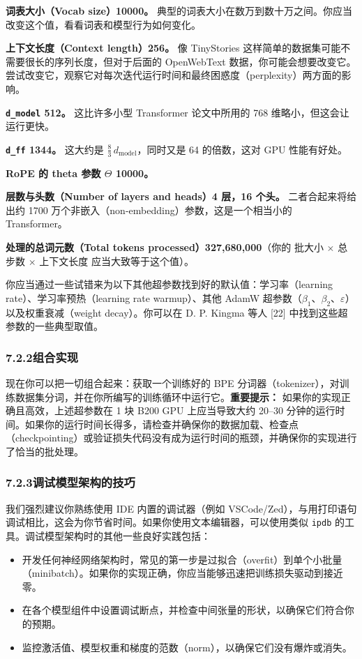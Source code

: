 \textbf{词表大小（Vocab size）10000。} 典型的词表大小在数万到数十万之间。你应当改变这个值，看看词表和模型行为如何变化。

\textbf{上下文长度（Context length）256。} 像 TinyStories 这样简单的数据集可能不需要很长的序列长度，但对于后面的 OpenWebText 数据，你可能会想要改变它。尝试改变它，观察它对每次迭代运行时间和最终困惑度（perplexity）两方面的影响。

\textbf{\texttt{d\_model} 512。} 这比许多小型 Transformer 论文中所用的 768 维略小，但这会让运行更快。

\textbf{\texttt{d\_ff} 1344。} 这大约是 $\frac{8}{3}\, d_{\text{model}}$，同时又是 64 的倍数，这对 GPU 性能有好处。

\textbf{RoPE 的 theta 参数 $\Theta$ 10000。}

\textbf{层数与头数（Number of layers and heads）4 层，16 个头。} 二者合起来将给出约 1700 万个非嵌入（non-embedding）参数，这是一个相当小的 Transformer。

\textbf{处理的总词元数（Total tokens processed）327{,}680{,}000}（你的 批大小 $\times$ 总步数 $\times$ 上下文长度 应当大致等于这个值）。

你应当通过一些试错来为以下其他超参数找到好的默认值：学习率（learning rate）、学习率预热（learning rate warmup）、其他 AdamW 超参数（$\beta_1$、$\beta_2$、$\varepsilon$）以及权重衰减（weight decay）。你可以在 D. P. Kingma 等人 [22] 中找到这些超参数的一些典型取值。

\subsubsection*{7.2.2\quad 组合实现}
现在你可以把一切组合起来：获取一个训练好的 BPE 分词器（tokenizer），对训练数据集分词，并在你所编写的训练循环中运行它。\textbf{重要提示：} 如果你的实现正确且高效，上述超参数在 1 块 B200 GPU 上应当导致大约 20–30 分钟的运行时间。如果你的运行时间长得多，请检查并确保你的数据加载、检查点（checkpointing）或验证损失代码没有成为运行时间的瓶颈，并确保你的实现进行了恰当的批处理。

\subsubsection*{7.2.3\quad 调试模型架构的技巧}
我们强烈建议你熟练使用 IDE 内置的调试器（例如 VSCode/Zed），与用打印语句调试相比，这会为你节省时间。如果你使用文本编辑器，可以使用类似 \texttt{ipdb} 的工具。调试模型架构时的其他一些良好实践包括：
\begin{itemize}
  \item 开发任何神经网络架构时，常见的第一步是过拟合（overfit）到单个小批量（minibatch）。如果你的实现正确，你应当能够迅速把训练损失驱动到接近零。
  \item 在各个模型组件中设置调试断点，并检查中间张量的形状，以确保它们符合你的预期。
  \item 监控激活值、模型权重和梯度的范数（norm），以确保它们没有爆炸或消失。
\end{itemize}

